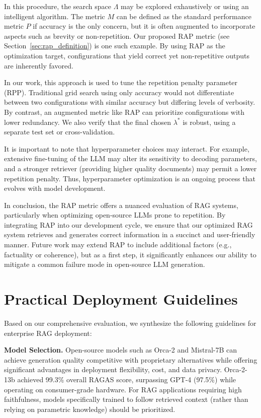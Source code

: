 In this procedure, the search space $\Lambda$ may be explored exhaustively or using an intelligent algorithm. The metric $M$ can be defined as the standard performance metric $P$ if accuracy is the only concern, but it is often augmented to incorporate aspects such as brevity or non-repetition. Our proposed RAP metric (see Section~\ref{sec:rap_definition}) is one such example. By using RAP as the optimization target, configurations that yield correct yet non-repetitive outputs are inherently favored.

In our work, this approach is used to tune the repetition penalty parameter (RPP). Traditional grid search using only accuracy would not differentiate between two configurations with similar accuracy but differing levels of verbosity. By contrast, an augmented metric like RAP can prioritize configurations with lower redundancy. We also verify that the final chosen $\lambda^*$ is robust, using a separate test set or cross-validation.

It is important to note that hyperparameter choices may interact. For example, extensive fine-tuning of the LLM may alter its sensitivity to decoding parameters, and a stronger retriever (providing higher quality documents) may permit a lower repetition penalty. Thus, hyperparameter optimization is an ongoing process that evolves with model development.

In conclusion, the RAP metric offers a nuanced evaluation of RAG systems, particularly when optimizing open-source LLMs prone to repetition. By integrating RAP into our development cycle, we ensure that our optimized RAG system retrieves and generates correct information in a succinct and user-friendly manner. Future work may extend RAP to include additional factors (e.g., factuality or coherence), but as a first step, it significantly enhances our ability to mitigate a common failure mode in open-source LLM generation.

\section{Practical Deployment Guidelines}
\label{sec:rag_guidelines}

Based on our comprehensive evaluation, we synthesize the following guidelines for enterprise RAG deployment:

\textbf{Model Selection.} Open-source models such as Orca-2 and Mistral-7B can achieve generation quality competitive with proprietary alternatives while offering significant advantages in deployment flexibility, cost, and data privacy. Orca-2-13b achieved 99.3\% overall RAGAS score, surpassing GPT-4 (97.5\%) while operating on consumer-grade hardware. For RAG applications requiring high faithfulness, models specifically trained to follow retrieved context (rather than relying on parametric knowledge) should be prioritized.

